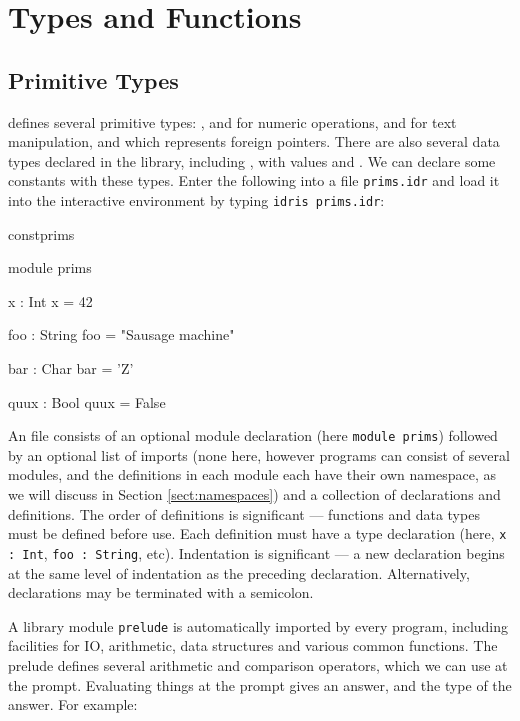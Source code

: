 \section{Types and Functions}

\subsection{Primitive Types}

\Idris{} defines several primitive types: ,  and
 for numeric operations,  and  for
text manipulation, and  which represents foreign pointers.
There are also several data types declared in the library, including
, with values  and .
We can declare some constants with these types. Enter the following
into a file \texttt{prims.idr} and load it into the \Idris{} interactive
environment by typing \texttt{idris prims.idr}:

\begin{SaveVerbatim}{constprims}

module prims

x : Int
x = 42

foo : String
foo = "Sausage machine"

bar : Char
bar = 'Z'

quux : Bool
quux = False

\end{SaveVerbatim}

\noindent
An \Idris{} file consists of an optional module declaration (here
\texttt{module prims}) followed by an optional list of imports (none here,
however \Idris{} programs can consist of several modules, and the definitions
in each module each have their own namespace, as we will discuss in Section
\ref{sect:namespaces}) and a
collection of declarations and definitions. The order of definitions is
significant --- functions and data types must be defined before use.
Each definition must have a type
declaration (here, \texttt{x : Int}, \texttt{foo : String}, etc).
Indentation is significant --- a new declaration begins at the same level
of indentation as the preceding declaration. Alternatively, declarations
may be terminated with a semicolon.

A library module \texttt{prelude} is automatically imported by every \Idris{} program,
including facilities for IO, arithmetic, data structures and various common
functions. The prelude defines several arithmetic and comparison operators,
which we can use at the prompt. Evaluating things at the prompt gives an
answer, and the type of the answer. For example:

